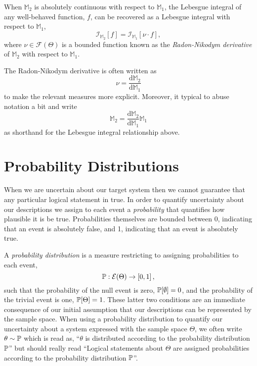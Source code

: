 When $\mathbb{M}_{2}$ is absolutely continuous with respect to
$\mathbb{M}_{1}$, the Lebesgue integral of any well-behaved
function, $f$, can be recovered as a Lebesgue integral with 
respect to $\mathbb{M}_{1}$,
%
\begin{equation*}
\mathcal{I}_{\mathbb{M}_{2}} \! \left[ f \right]
=
\mathcal{I}_{\mathbb{M}_{1}} \! \left[ \nu \cdot f \right],
\end{equation*}
%
where $\nu \in \mathcal{F} \! \left( \Theta \right)$ is a bounded function
known as the \emph{Radon-Nikodym derivative} of $\mathbb{M}_{2}$ 
with respect to $\mathbb{M}_{1}$.  

The Radon-Nikodym derivative is often written as
%
\begin{equation*}
\nu = \frac{ \mathrm{d} \mathbb{M}_{2} }{ \mathrm{d} \mathbb{M}_{1} }
\end{equation*}
%
to make the relevant measures more explicit.  Moreover, it typical to
abuse notation a bit and write
%
\begin{equation*}
\mathbb{M}_{2} = 
\frac{ \mathrm{d} \mathbb{M}_{2} }{ \mathrm{d} \mathbb{M}_{1} } 
\mathbb{M}_{1}
\end{equation*}
%
as shorthand for the Lebesgue integral relationship above.

\section{Probability Distributions}

When we are uncertain about our target system then we cannot
guarantee that any particular logical statement in true.  In order to
quantify uncertainty about our descriptions we assign to each event 
a \emph{probability} that quantifies how plausible it is be true.  
Probabilities themselves are bounded between 0, indicating that an 
event is absolutely false, and 1, indicating that an event is absolutely
true.

A \emph{probability distribution} is a measure restricting to assigning
probabilities to each event,
%
\begin{equation*}
\mathbb{P} : \mathcal{E} \! \left( \Theta \right) \rightarrow \left[0, 1 \right],
\end{equation*}
%
such that the probability of the null event is zero, 
$\mathbb{P} \! \left[ \emptyset \right] = 0$, and the probability of the trivial
event is one, $\mathbb{P} \! \left[ \Theta \right] = 1$.  These latter two conditions 
are an immediate consequence of our initial assumption that our descriptions
can be represented by the sample space.  When using a probability distribution 
to quantify our uncertainty about a system expressed with the sample
space $\Theta$, we often write $\theta \sim \mathbb{P}$ which is read as, 
``$\theta$ is distributed according to the probability distribution $\mathbb{P}$''
but should really read ``Logical statements about $\Theta$ are assigned 
probabilities according to the probability distribution $\mathbb{P}$''.

